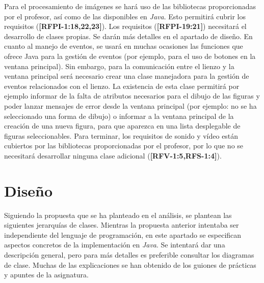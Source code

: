 \vskip0.3cm
Para el procesamiento de imágenes se hará uso de las bibliotecas proporcionadas por el profesor, así como de las disponibles en \textit{Java}. Esto permitirá cubrir los requisitos (\textbf{[RFPI-1:18,22,23]}). Los requisitos (\textbf{[RFPI-19:21]}) necesitará el desarrollo de clases propias. Se darán más detalles en el apartado de diseño.
\vskip0.3cm
En cuanto al manejo de eventos, se usará en muchas ocasiones las funciones que ofrece Java para la gestión de eventos (por ejemplo, para el uso de botones en la ventana principal). Sin embargo, para la comunicación entre el lienzo y la ventana principal será necesario crear una clase manejadora para la gestión de eventos relacionados con el lienzo. La existencia de esta clase permitirá por ejemplo informar de la falta de atributos necesarios para el dibujo de las figuras y poder lanzar mensajes de error desde la ventana principal (por ejemplo: no se ha seleccionado una forma de dibujo) o informar a la ventana principal de la creación de una nueva figura, para que aparezca en una lista desplegable de figuras seleccionables. 
\vskip0.3cm
Para terminar, los requisitos de sonido y vídeo están cubiertos por las bibliotecas proporcionadas por el profesor, por lo que no se necesitará desarrollar ninguna clase adicional (\textbf{[RFV-1:5,RFS-1:4]}).
\clearpage
\section{Diseño}
Siguiendo la propuesta que se ha planteado en el análisis, se plantean las siguientes jerarquías de clases. Mientras la propuesta anterior intentaba ser independiente del lenguaje de programación, en este apartado se especifican aspectos concretos de la implementación en \textit{Java}.
\vskip0.3cm
Se intentará dar una descripción general, pero para más detalles es preferible consultar los diagramas de clase. Muchas de las explicaciones se han obtenido de los guiones de prácticas y apuntes de la asignatura.
